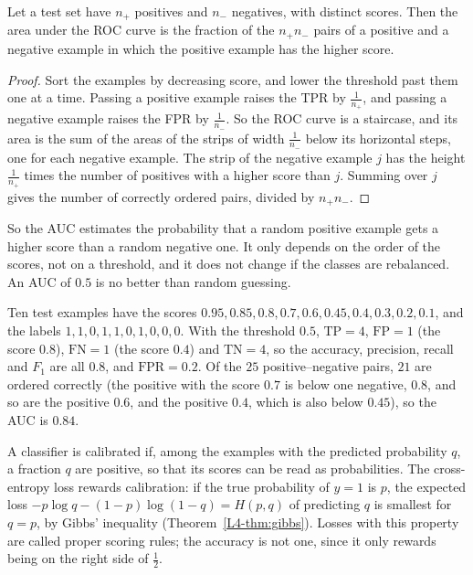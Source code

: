\begin{theorem}\label{L4-thm:auc}
    Let a test set have $n_+$ positives and $n_-$ negatives, with distinct scores. Then the area under the ROC curve is the fraction of the $n_+n_-$ pairs of a positive and a negative example in which the positive example has the higher score.
\end{theorem}

\begin{proof}
    Sort the examples by decreasing score, and lower the threshold past them one at a time. Passing a positive example raises the TPR by $\frac{1}{n_+}$, and passing a negative example raises the FPR by $\frac{1}{n_-}$. So the ROC curve is a staircase, and its area is the sum of the areas of the strips of width $\frac{1}{n_-}$ below its horizontal steps, one for each negative example. The strip of the negative example $j$ has the height $\frac{1}{n_+}$ times the number of positives with a higher score than $j$. Summing over $j$ gives the number of correctly ordered pairs, divided by $n_+n_-$.
\end{proof}

So the AUC estimates the probability that a random positive example gets a higher score than a random negative one. It only depends on the order of the scores, not on a threshold, and it does not change if the classes are rebalanced. An AUC of $0.5$ is no better than random guessing.

\begin{example}\label{L4-ex:metrics}
    Ten test examples have the scores $0.95, 0.85, 0.8, 0.7, 0.6, 0.45, 0.4, 0.3, 0.2, 0.1$, and the labels $1, 1, 0, 1, 1, 0, 1, 0, 0, 0$. With the threshold $0.5$, $\mathrm{TP} = 4$, $\mathrm{FP} = 1$ (the score $0.8$), $\mathrm{FN} = 1$ (the score $0.4$) and $\mathrm{TN} = 4$, so the accuracy, precision, recall and $F_1$ are all $0.8$, and $\mathrm{FPR} = 0.2$. Of the $25$ positive--negative pairs, $21$ are ordered correctly (the positive with the score $0.7$ is below one negative, $0.8$, and so are the positive $0.6$, and the positive $0.4$, which is also below $0.45$), so the AUC is $0.84$.
\end{example}

A classifier is calibrated if, among the examples with the predicted probability $q$, a fraction $q$ are positive, so that its scores can be read as probabilities. The cross-entropy loss rewards calibration: if the true probability of $y = 1$ is $p$, the expected loss $-p\log q - (1 - p)\log(1 - q) = H(p, q)$ of predicting $q$ is smallest for $q = p$, by Gibbs' inequality (Theorem~\ref{L4-thm:gibbs}). Losses with this property are called proper scoring rules; the accuracy is not one, since it only rewards being on the right side of $\frac{1}{2}$.

